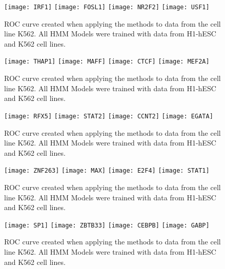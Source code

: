 \documentclass[11pt,a4]{article}
\begin{document}
\begin{figure}[h]
\centering
    \texttt{[image: IRF1]}
    \texttt{[image: FOSL1]}
    \texttt{[image: NR2F2]}
    \texttt{[image: USF1]}
\caption{ROC curve created when applying the methods to data from the cell line K562. All HMM Models were trained with data from H1-hESC and K562 cell lines.}
\label{fig:roc.K562.11}
\end{figure}

\begin{figure}[h]
\centering
    \texttt{[image: THAP1]}
    \texttt{[image: MAFF]}
    \texttt{[image: CTCF]}
    \texttt{[image: MEF2A]}
\caption{ROC curve created when applying the methods to data from the cell line K562. All HMM Models were trained with data from H1-hESC and K562 cell lines.}
\label{fig:roc.K562.12}
\end{figure}

\begin{figure}[h]
\centering
    \texttt{[image: RFX5]}
    \texttt{[image: STAT2]}
    \texttt{[image: CCNT2]}
    \texttt{[image: EGATA]}
\caption{ROC curve created when applying the methods to data from the cell line K562. All HMM Models were trained with data from H1-hESC and K562 cell lines.}
\label{fig:roc.K562.13}
\end{figure}

\begin{figure}[h]
\centering
    \texttt{[image: ZNF263]}
    \texttt{[image: MAX]}
    \texttt{[image: E2F4]}
    \texttt{[image: STAT1]}
\caption{ROC curve created when applying the methods to data from the cell line K562. All HMM Models were trained with data from H1-hESC and K562 cell lines.}
\label{fig:roc.K562.14}
\end{figure}

\begin{figure}[h]
\centering
    \texttt{[image: SP1]}
    \texttt{[image: ZBTB33]}
    \texttt{[image: CEBPB]}
    \texttt{[image: GABP]}
\caption{ROC curve created when applying the methods to data from the cell line K562. All HMM Models were trained with data from H1-hESC and K562 cell lines.}
\label{fig:roc.K562.15}
\end{figure}
\end{document}
